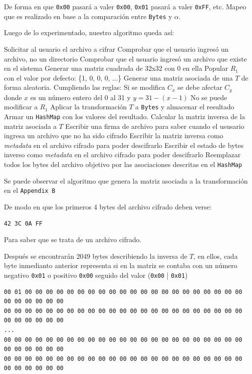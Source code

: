 \documentclass[a4paper]{article}
\begin{document}
De forma en que \texttt{0x00} pasará a valer \texttt{0x00}, \texttt{0x01} pasará a valer \texttt{0xFF}, etc. Mapeo que es realizado en base a la comparación entre \texttt{Bytes} y $\alpha$.

Luego de lo experimentado, nuestro algoritmo queda así:

\begin{outline}[enumerate]
    \1 Solicitar al usuario el archivo a cifrar
    \1 Comprobar que el usuario ingresó un archivo, no un directorio
    \1 Comprobar que el usuario ingresó un archivo que existe en el sistema
    \1 Generar una matriz cuadrada de 32x32 con 0 en ella
    \1 Popular $R_1$ con el valor por defecto: \{1, 0, 0, 0, ...\}
    \1 Generar una matriz asociada de una $T$ de forma aleatoria. Cumpliendo las reglas:
        \2 Si se modifica $C_x$ se debe afectar $C_y$ donde $x$ es un número entero del 0 al 31 y $y = 31 - (x-1)$
        \2 No se puede modificar a $R_1$
    \1 Aplicar la transformación $T$ a \texttt{Bytes} y almacenar el resultado
    \1 Armar un \texttt{HashMap} con los valores del resultado.
    \1 Calcular la matriz inversa de la matriz asociada a $T$
    \1 Escribir una firma de archivo para saber cuando el ususario ingresa un archivo que no ha sido cifrado
    \1 Escribir la matriz inversa como \textit{metadata} en el archivo cifrado para poder descifrarlo
    \1 Escribir el estado de bytes inverso como \textit{metadata} en el archivo cifrado para poder descifrarlo
    \1 Reemplazar todos los bytes del archivo objetivo por las asociaciones descritas en el \texttt{HashMap}
\end{outline}

Se puede observar el algoritmo que genera la matriz asociada a la transformación en el \texttt{Appendix B}

De modo en que los primeros 4 bytes del archivo cifrado deben verse:

\begin{verbatim}
42 3C 0A FF
\end{verbatim}

Para saber que se trata de un archivo cifrado.

Después se encontrarán 2049 bytes describiendo la inversa de $T$, en ellos, cada byte inmedianto anterior representa si en la matriz se contaba con un número negativo \texttt{0x01} o positivo \texttt{0x00} seguido del valor (\texttt{0x00} | \texttt{0x01})

\begin{verbatim}
00 01 00 00 00 00 00 00 00 00 00 00 00 00 00 00 00 00 00 00 00 00 00 00 00 00 00 00 00
00 00 00 00 00 00 00 00 00 00 00 00 00 00 00 00 00 00 00 00 00 00 00 00 00 00 00 00 00
...
00 00 00 00 00 00 00 00 00 00 00 00 00 00 00 00 00 00 00 00 00 00 00 00 00 00 00 00 00
00 00 00 00 00 00 00 00 00 00 00 00 00 00 00 00 00 00 00 00 00 00 00 00 00 00 00 00 00
\end{verbatim}
\end{document}
